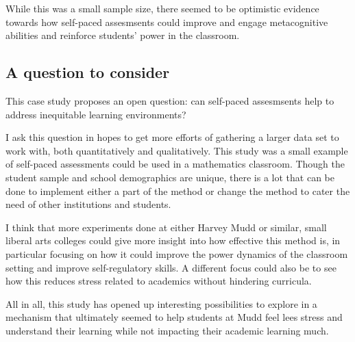 While this was a small sample size, there seemed to be optimistic evidence towards how self-paced assesmsents could improve and engage metacognitive abilities and reinforce students' power in the classroom.

\subsection{A question to consider}

This case study proposes an open question: can self-paced assesmsents help to address inequitable learning environments?

I ask this question in hopes to get more efforts of gathering a larger data set to work with, both quantitatively and qualitatively. This study was a small example of self-paced assessments could be used in a mathematics classroom. Though the student sample and school demographics are unique, there is a lot that can be done to implement either a part of the method or change the method to cater the need of other institutions and students.

I think that more experiments done at either Harvey Mudd or similar, small liberal arts colleges could give more insight into how effective this method is, in particular focusing on how it could improve the power dynamics of the classroom setting and improve self-regulatory skills. A different focus could also be to see how this reduces stress related to academics without hindering curricula.

All in all, this study has opened up interesting possibilities to explore in a mechanism that ultimately seemed to help students at Mudd feel lees stress and understand their learning while not impacting their academic learning much.

